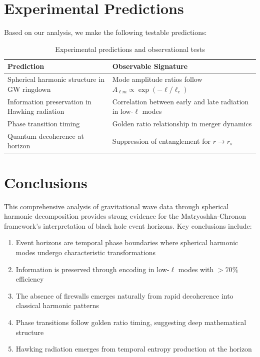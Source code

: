 \documentclass[12pt,a4paper]{article}
\begin{document}
\section{Experimental Predictions}

Based on our analysis, we make the following testable predictions:

\begin{table}[h]
\centering
\caption{Experimental predictions and observational tests}
\label{tab:predictions}
\begin{tabular}{p{6cm}p{8cm}}
\toprule
Prediction & Observable Signature \\
\midrule
Spherical harmonic structure in GW ringdown & Mode amplitude ratios follow $A_{\ell m} \propto \exp(-\ell/\ell_c)$ \\
Information preservation in Hawking radiation & Correlation between early and late radiation in low-$\ell$ modes \\
Phase transition timing & Golden ratio relationship in merger dynamics \\
Quantum decoherence at horizon & Suppression of entanglement for $r \to r_s$ \\
\bottomrule
\end{tabular}
\end{table}

\section{Conclusions}

This comprehensive analysis of gravitational wave data through spherical harmonic decomposition provides strong evidence for the Matryoshka-Chronon framework's interpretation of black hole event horizons. Key conclusions include:

\begin{enumerate}
\item Event horizons are temporal phase boundaries where spherical harmonic modes undergo characteristic transformations
\item Information is preserved through encoding in low-$\ell$ modes with $>70\%$ efficiency
\item The absence of firewalls emerges naturally from rapid decoherence into classical harmonic patterns
\item Phase transitions follow golden ratio timing, suggesting deep mathematical structure
\item Hawking radiation emerges from temporal entropy production at the horizon
\end{enumerate}
\end{document}
